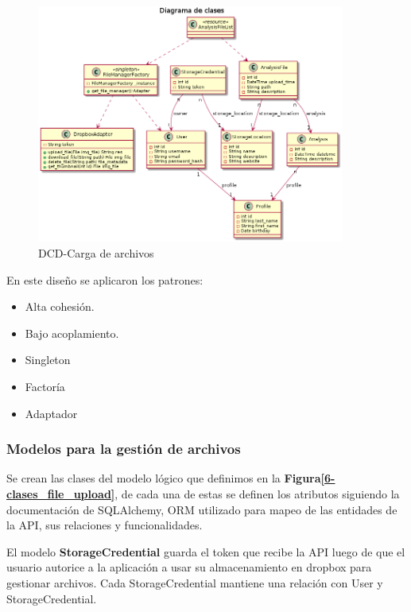 \documentclass[a4paper,12pt]{article}
\begin{document}
	\begin{figure}[h]
        \centering
        \includegraphics[width=0.9\textwidth]{img/dcd_file_upload}
        \caption{DCD-Carga de archivos}
		\label{6-dcd_file_upload}
    \end{figure}
   
\newpage

	En este diseño se aplicaron los patrones:
		\begin{itemize}			
			\item Alta cohesión.
			\item Bajo acoplamiento.
			\item Singleton
			\item Factoría
			\item Adaptador
		\end{itemize}

\subsubsection{Modelos para la gestión de archivos}

Se crean las clases del modelo lógico que definimos en la \textbf{Figura\ref{6-clases_file_upload}}, de cada una de estas se definen los atributos siguiendo la documentación de SQLAlchemy, ORM utilizado para mapeo de las entidades de la API, sus relaciones y funcionalidades. 

El modelo \textbf{StorageCredential} guarda el token que recibe la API luego de que el usuario autorice a la aplicación a usar su almacenamiento en dropbox para gestionar archivos. Cada StorageCredential mantiene una relación con User y StorageCredential.
\end{document}
